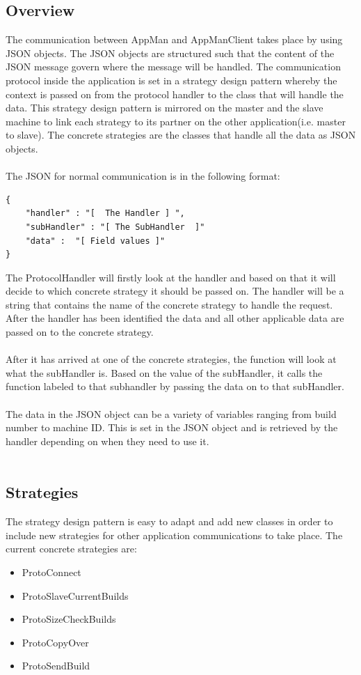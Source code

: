 \documentclass[a4paper,12pt,final]{article}
\begin{document}
\subsection{Overview}
The communication between AppMan and AppManClient takes place 
by using JSON objects. The JSON objects are structured such that the 
content of the JSON message govern where the message will be handled. 
The communication protocol inside the application is set in a strategy design pattern
whereby the context is passed on from the protocol handler to the class that will 
handle the data. This strategy design pattern is mirrored on the master and the slave
machine to link each strategy to its partner on the other application(i.e. master to slave).
The concrete strategies are the classes that handle all the data as JSON objects.\\
\textbf{\\}
The JSON for normal communication is in the following format:
\begin{verbatim}
{
	"handler" : "[  The Handler ] ",
	"subHandler" : "[ The SubHandler  ]"
	"data" :  "[ Field values ]"
}
\end{verbatim}
The ProtocolHandler will firstly look at the handler and based on that it will decide to
which concrete strategy it should be passed on. The handler will be a string that contains
the name of the concrete strategy to handle the request. After the handler has been 
identified the data and all other applicable data are passed on to the concrete strategy.\\
\textbf{\\}
After it has arrived at one of the concrete strategies, the function will look at what
the subHandler is. Based on the value of the subHandler, it calls the function labeled
to that subhandler by passing the data on to that subHandler.\\
\textbf{\\}
The data in the JSON object can be a variety of variables ranging from build number
to machine ID. This is set in the JSON object and is retrieved by the handler depending
on when they need to use it.\\
\textbf{\\}

\subsection{Strategies}
The strategy design pattern is easy to adapt and add new classes in order to include
new strategies for other application communications to take place. The current concrete
strategies are:
\begin{itemize}
\item ProtoConnect
\item ProtoSlaveCurrentBuilds
\item ProtoSizeCheckBuilds
\item ProtoCopyOver
\item ProtoSendBuild
\end{itemize}
\end{document}
